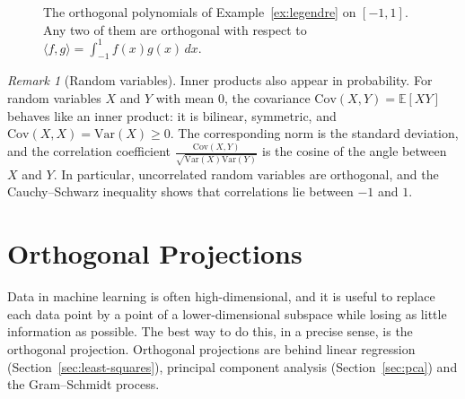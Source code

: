 \documentclass[11pt]{article}
\newcommand{\ip}[2]{\langle #1, #2 \rangle}
\theoremstyle{definition}
\theoremstyle{plain}
\theoremstyle{remark}
\newtheorem{remark}[definition]{Remark}
\begin{document}
\begin{figure}[ht]
    \centering
    \caption[Legendre polynomials]{The orthogonal polynomials of Example~\ref{ex:legendre} on $[-1, 1]$. Any two of them are orthogonal with respect to $\ip{f}{g} = \int_{-1}^1 f(x) g(x) \, dx$.}
    \label{fig:legendre}
\end{figure}

\begin{remark}[Random variables]
    Inner products also appear in probability. For random variables $X$ and $Y$ with mean $0$, the covariance $\mathrm{Cov}(X, Y) = \mathbb{E}[XY]$ behaves like an inner product: it is bilinear, symmetric, and $\mathrm{Cov}(X, X) = \mathrm{Var}(X) \geq 0$. The corresponding norm is the standard deviation, and the correlation coefficient $\frac{\mathrm{Cov}(X, Y)}{\sqrt{\mathrm{Var}(X)\mathrm{Var}(Y)}}$ is the cosine of the angle between $X$ and $Y$. In particular, uncorrelated random variables are orthogonal, and the Cauchy--Schwarz inequality shows that correlations lie between $-1$ and $1$.
\end{remark}

\section{Orthogonal Projections}\label{sec:projections}

Data in machine learning is often high-dimensional, and it is useful to replace each data point by a point of a lower-dimensional subspace while losing as little information as possible. The best way to do this, in a precise sense, is the orthogonal projection. Orthogonal projections are behind linear regression (Section~\ref{sec:least-squares}), principal component analysis (Section~\ref{sec:pca}) and the Gram--Schmidt process.
\end{document}
